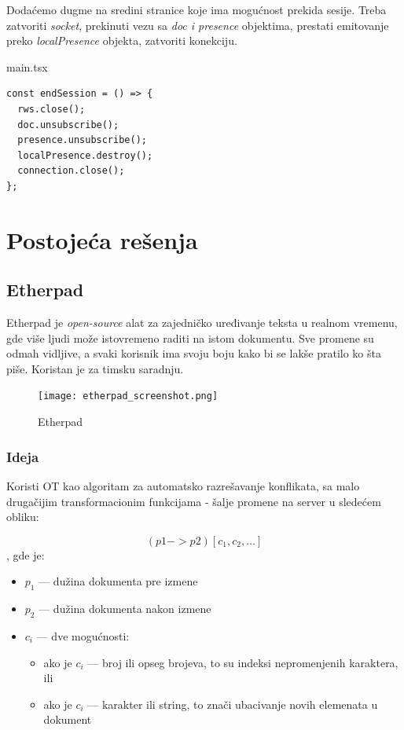 \documentclass[12pt]{article}
\newcommand{\startnewsection}{
    \clearpage %
    \ifodd\value{page}\else %
        \hbox{} %
        \newpage %
    \fi
}
\begin{document}
Dodaćemo dugme na sredini stranice koje ima mogućnost prekida sesije. Treba zatvoriti \textit{socket}, prekinuti vezu sa \textit{doc i presence} objektima, prestati emitovanje preko \textit{localPresence} objekta, zatvoriti konekciju.

\begin{mylisting}[label={lst:example}]{main.tsx}
\begin{lstlisting}
const endSession = () => {
  rws.close();
  doc.unsubscribe();
  presence.unsubscribe();
  localPresence.destroy();
  connection.close();
};
\end{lstlisting}
\end{mylisting}

\startnewsection

\section{Postojeća rešenja}

\subsection{Etherpad}

Etherpad je \textit{open-source} alat za zajedničko uređivanje teksta u realnom vremenu, gde više ljudi može istovremeno raditi na istom dokumentu. Sve promene su odmah vidljive, a svaki korisnik ima svoju boju kako bi se lakše pratilo ko šta piše. Koristan je za timsku saradnju.

\begin{figure}[H]
	\centering
	\texttt{[image: etherpad\_screenshot.png]}
	\caption{Etherpad}
	\label{fig:nls_demo}
\end{figure}

\subsubsection{Ideja}
Koristi OT kao algoritam za automatsko razrešavanje konflikata, sa malo drugačijim transformacionim funkcijama - šalje promene na server u sledećem obliku:

\[ (p1 -> p2)[c_1, c_2, …] \], gde je:

\begin{itemize}
    \item $p_1$ — dužina dokumenta pre izmene
    \item $p_2$ — dužina dokumenta nakon izmene
    \item $c_i$ — dve mogućnosti:
    \begin{itemize}
        \item ako je $c_i$ — broj ili opseg brojeva, to su indeksi nepromenjenih karaktera, ili
        \item ako je $c_i$ — karakter ili string, to znači ubacivanje novih elemenata u dokument
    \end{itemize}
\end{itemize}
\end{document}
